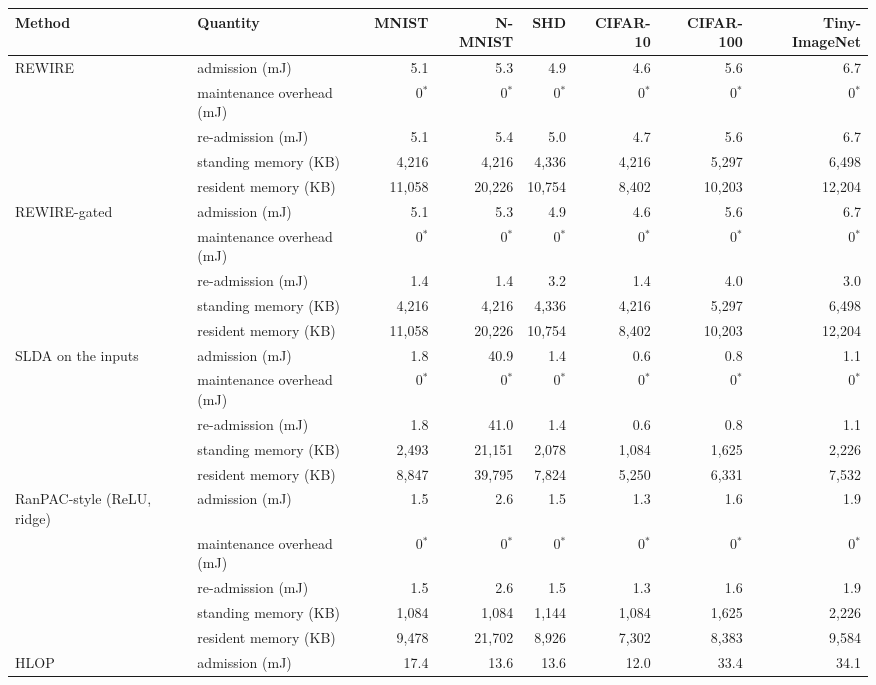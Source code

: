 \begin{tabular*}{\textwidth}{@{\extracolsep{\fill}}lp{3.2cm}rrrrrr@{}}
\toprule
Method & Quantity & MNIST & N-MNIST & SHD & CIFAR-10 & CIFAR-100 & Tiny-ImageNet \\
\midrule
REWIRE & admission (mJ) & 5.1 & 5.3 & 4.9 & 4.6 & 5.6 & 6.7 \\
 & maintenance overhead (mJ) & 0$^{*}$ & 0$^{*}$ & 0$^{*}$ & 0$^{*}$ & 0$^{*}$ & 0$^{*}$ \\
 & re-admission (mJ) & 5.1 & 5.4 & 5.0 & 4.7 & 5.6 & 6.7 \\
 & standing memory (KB) & 4,216 & 4,216 & 4,336 & 4,216 & 5,297 & 6,498 \\
 & resident memory (KB) & 11,058 & 20,226 & 10,754 & 8,402 & 10,203 & 12,204 \\
REWIRE-gated & admission (mJ) & 5.1 & 5.3 & 4.9 & 4.6 & 5.6 & 6.7 \\
 & maintenance overhead (mJ) & 0$^{*}$ & 0$^{*}$ & 0$^{*}$ & 0$^{*}$ & 0$^{*}$ & 0$^{*}$ \\
 & re-admission (mJ) & 1.4 & 1.4 & 3.2 & 1.4 & 4.0 & 3.0 \\
 & standing memory (KB) & 4,216 & 4,216 & 4,336 & 4,216 & 5,297 & 6,498 \\
 & resident memory (KB) & 11,058 & 20,226 & 10,754 & 8,402 & 10,203 & 12,204 \\
SLDA on the inputs & admission (mJ) & 1.8 & 40.9 & 1.4 & 0.6 & 0.8 & 1.1 \\
 & maintenance overhead (mJ) & 0$^{*}$ & 0$^{*}$ & 0$^{*}$ & 0$^{*}$ & 0$^{*}$ & 0$^{*}$ \\
 & re-admission (mJ) & 1.8 & 41.0 & 1.4 & 0.6 & 0.8 & 1.1 \\
 & standing memory (KB) & 2,493 & 21,151 & 2,078 & 1,084 & 1,625 & 2,226 \\
 & resident memory (KB) & 8,847 & 39,795 & 7,824 & 5,250 & 6,331 & 7,532 \\
RanPAC-style (ReLU, ridge) & admission (mJ) & 1.5 & 2.6 & 1.5 & 1.3 & 1.6 & 1.9 \\
 & maintenance overhead (mJ) & 0$^{*}$ & 0$^{*}$ & 0$^{*}$ & 0$^{*}$ & 0$^{*}$ & 0$^{*}$ \\
 & re-admission (mJ) & 1.5 & 2.6 & 1.5 & 1.3 & 1.6 & 1.9 \\
 & standing memory (KB) & 1,084 & 1,084 & 1,144 & 1,084 & 1,625 & 2,226 \\
 & resident memory (KB) & 9,478 & 21,702 & 8,926 & 7,302 & 8,383 & 9,584 \\
HLOP & admission (mJ) & 17.4 & 13.6 & 13.6 & 12.0 & 33.4 & 34.1 \\

\end{tabular*}
